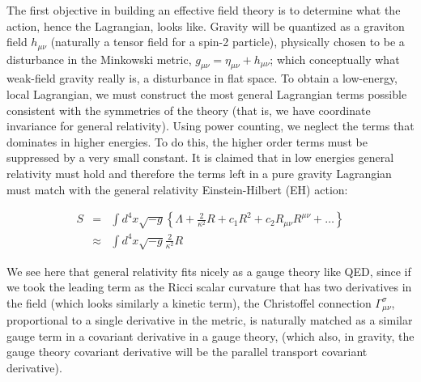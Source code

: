 \documentclass[%
 aip,
rsi,%
 amsmath,amssymb,
 reprint,%
]{revtex4-1}
\begin{document}
\hspace{\parindent}The first objective in building an effective field theory is to determine what the action, hence the Lagrangian, looks like. Gravity will be quantized as a graviton field $h_{\mu\nu}$ (naturally a tensor field for a spin-2 particle), physically chosen to be a disturbance in the Minkowski metric, $g_{\mu\nu}=\eta_{\mu\nu}+h_{\mu\nu}$; which conceptually what weak-field gravity really is, a disturbance in flat space. 
To obtain a low-energy, local Lagrangian, we must construct the most general Lagrangian terms possible consistent with the symmetries of the theory (that is, we have coordinate invariance for general relativity). Using power counting, we neglect the terms that dominates in higher energies. To do this, the higher order terms must be suppressed by a very small constant.
It is claimed that in low energies general relativity must hold and therefore the terms left in a pure gravity Lagrangian must match with the general relativity Einstein-Hilbert (EH) action:

\begin{eqnarray}
	S&=&\int d^4 x\sqrt{-g}\left\lbrace\Lambda+\frac{2}{\kappa^2}R+c_1R^2+c_2R_{\mu\nu}R^{\mu\nu}+\ldots \right\rbrace \nonumber
	\\&\approx&\int d^4 x\sqrt{-g}\frac{2}{\kappa^2}R 
\end{eqnarray}

We see here that general relativity fits nicely as a gauge theory like QED, since if we took the leading term as the Ricci scalar curvature that has two derivatives in the field (which looks similarly a kinetic term), the Christoffel connection $\Gamma_{\mu\nu}^\sigma$, proportional to a single derivative in the metric, is naturally matched as a similar gauge term in a covariant derivative in a gauge theory, (which also, in gravity, the gauge theory covariant derivative will be the parallel transport covariant derivative).
 
\end{document}
